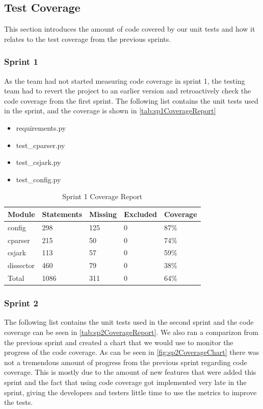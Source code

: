 \subsection{Test Coverage}
This section introduces the amount of code covered by our unit tests and how it relates to the test coverage from the previous sprints.

\subsubsection{Sprint 1}
As the team had not started measuring code coverage in sprint 1, the testing team had to revert the project to an earlier version and retroactively check the code coverage from the first sprint. The following list contains the unit tests used in the sprint, and the coverage is shown in \autoref{tab:sp1CoverageReport}

\begin {itemize}
\item requirements.py
\item test\_cparser.py
\item test\_csjark.py
\item test\_config.py
\end{itemize}

\begin{table}[!htb]\footnotesize\center
	\caption{Sprint 1 Coverage Report\label{tab:sp1CoverageReport}}
	\begin{tabular}{l l l l l}
		\toprule
		Module & Statements & Missing & Excluded & Coverage\\
		\midrule
		config & 298 & 125 & 0 & 87\%\ \\
		cparser & 215 & 50 & 0 & 74\%\ \\
		csjark & 113 & 57 & 0 & 59\%\ \\
		\gls{dissector} & 460 & 79 & 0 & 38\%\ \\
		Total & 1086 & 311 & 0 & 64\%\ \\
		\bottomrule
	\end{tabular}
\end{table}

\subsubsection{Sprint 2}
The following list contains the unit tests used in the second sprint and the code coverage can be seen in \autoref{tab:sp2CoverageReport}. We also ran a comparizon from the previous sprint and created a chart that we would use to monitor the progress of the code coverage. As can be seen in \autoref{fig:sp2CoverageChart} there was not a tremendous amount of progress from the previous sprint regarding code coverage. This is mostly due to the amount of new features that were added this sprint and the fact that using code coverage got implemented very late in the sprint, giving the developers and testers little time to use the metrics to improve the tests.

